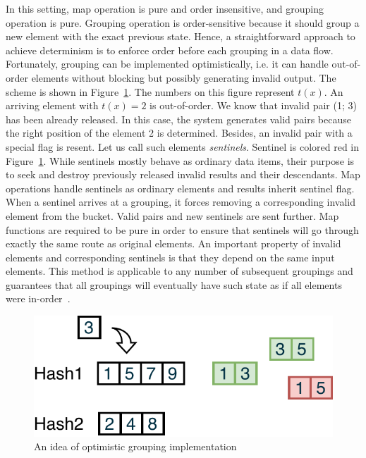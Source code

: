In this setting, map operation is pure and order insensitive, and grouping operation is pure. Grouping operation is order-sensitive because it should group a new element with the exact previous state. Hence, a straightforward approach to achieve determinism is to enforce order before each grouping in a data flow. Fortunately, grouping can be implemented optimistically, i.e. it can handle out-of-order elements without blocking but possibly generating invalid output. The scheme is shown in Figure~\ref{optimistic-grouping}. The numbers on this figure represent $t(x)$. An arriving element with $t(x)=2$ is out-of-order. We know that invalid pair (1; 3) has been already released. In this case, the system generates valid pairs because the right position of the element 2 is determined. Besides, an invalid pair with a special flag is resent. Let us call such elements {\em sentinels}. Sentinel is colored red in Figure~\ref{optimistic-grouping}. While sentinels mostly behave as ordinary data items, their purpose is to seek and destroy previously released invalid results and their descendants. Map operations handle sentinels as ordinary elements and results inherit sentinel flag. When a sentinel arrives at a grouping, it forces removing a corresponding invalid element from the bucket. Valid pairs and new sentinels are sent further. Map functions are required to be pure in order to ensure that sentinels will go through exactly the same route as original elements. An important property of invalid elements and corresponding sentinels is that they depend on the same input elements. This method is applicable to any number of subsequent groupings and guarantees that all groupings will eventually have such state as if all elements were in-order~\cite{we2018adbis}.
 
\begin{figure}[htbp]
  \centering
  \includegraphics[width=\columnwidth]{pics/grouping-invalidation}
  \caption{An idea of optimistic grouping implementation}
  \label {optimistic-grouping}
\end{figure} 

